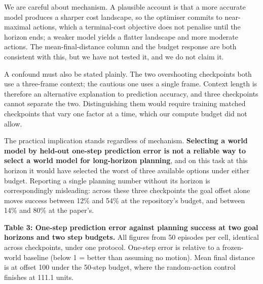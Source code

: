 \documentclass[10pt]{article}
\begin{document}
We are careful about mechanism. A plausible account is that a more accurate
model produces a sharper cost landscape, so the optimiser commits to
near-maximal actions, which a terminal-cost objective does not penalise until
the horizon ends; a weaker model yields a flatter landscape and more moderate
actions. The mean-final-distance column and the budget response are both
consistent with this, but we have not tested it, and we do not claim it.

A confound must also be stated plainly. The two overshooting checkpoints both
use a three-frame context; the cautious one uses a single frame. Context length
is therefore an alternative explanation to prediction accuracy, and three
checkpoints cannot separate the two. Distinguishing them would require training
matched checkpoints that vary one factor at a time, which our compute budget did
not allow.

The practical implication stands regardless of mechanism. \textbf{Selecting a world
model by held-out one-step prediction error is not a reliable way to select a
world model for long-horizon planning}, and on this task at this horizon it
would have selected the worst of three available options under either budget.
Reporting a single planning number without its horizon is correspondingly
misleading: across these three checkpoints the goal offset alone moves success
between 12\% and 54\% at the repository's budget, and between 14\% and 80\% at the
paper's.

\medskip\noindent
\textbf{Table 3: One-step prediction error against planning success at two goal
horizons and two step budgets.} All figures from 50 episodes per cell,
identical across checkpoints, under one protocol. One-step error is relative
to a frozen-world baseline (below 1 = better than assuming no motion). Mean
final distance is at offset 100 under the 50-step budget, where the
random-action control finishes at 111.1 units.
\medskip
\end{document}
